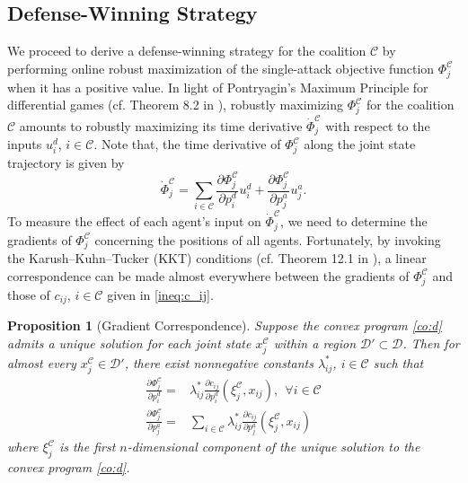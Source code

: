 \documentclass[journal]{IEEEtran}
\newtheorem{Proposition}{\bf Proposition}
\newcommand{\D}{\mathcal{D}}
\newcommand{\C}{\mathcal{C}}
\newcommand{\1}{\mathbf{1}}
\begin{document}
\subsection{Defense-Winning Strategy}\label{sec:gbdws}

We proceed to derive a defense-winning strategy for the coalition $\C$ by performing online robust maximization of the single-attack objective function $\Phi^\C_j$ when it has a positive value. In light of Pontryagin's Maximum Principle for differential games (cf. Theorem 8.2 in \cite{nocedal2006numerical}), robustly maximizing $\Phi^\C_j$ for the coalition $\C$ amounts to robustly maximizing its time derivative $\dot{\Phi}^\C_j$ with respect to the inputs $u^d_i$, $i\in \C$. Note that, the time derivative of $\Phi^\C_j$ along the joint state trajectory is given by
\begin{equation}\label{eq:deriv_d}
	\dot{\Phi}^\C_j=\sum_{i\in \C}\frac{\partial \Phi^\C_j}{\partial p^d_i}u^d_i+\frac{\partial \Phi^\C_j}{\partial p^a_j}u^a_j.
\end{equation}
To measure the effect of each agent's input on $\dot{\Phi}^\C_j$, we need to determine the gradients of $\Phi^\C_j$ concerning the positions of all agents. Fortunately, by invoking the Karush–Kuhn–Tucker (KKT) conditions (cf. Theorem 12.1 in \cite{nocedal2006numerical}), a linear correspondence can be made almost everywhere between the gradients of $\Phi^\C_j$ and those of $c_{ij}$, $i\in \C$ given in \eqref{ineq:c_ij}. 

\begin{Proposition}[Gradient Correspondence]\label{prop:gc}
Suppose the convex program \eqref{co:d} admits a unique solution for each joint state $x^\C_j$ within a region $\D'\subset \D$. Then for almost every $x^\C_j\in \D'$, there exist nonnegative constants $\lambda_{ij}^*$, $i\in \C$ such that 
\begin{equation}\label{eq:gc}
	\begin{split}
	    \frac{\partial \Phi^\C_j}{\partial p^d_i
	    }=&\lambda_{ij}^*\frac{\partial c_{ij}}{\partial p^d_i}(\xi^\C_j,x_{ij}),~~\forall i\in \C\\
	    \frac{\partial \Phi^\C_j}{\partial p^a_j
	    }=&\sum_{i\in \C}\lambda_{ij}^*\frac{\partial c_{ij}}{\partial p^a_j}(\xi^\C_j,x_{ij})
	\end{split}
\end{equation}
where $\xi^\C_j$ is the first $n$-dimensional component of the unique solution to the convex program \eqref{co:d}. 
\end{Proposition}
\end{document}
